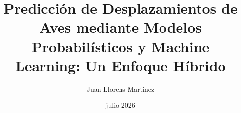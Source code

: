 \newcommand{\Estudios}{Grado}

\newcommand{\TituloEstudios}{Matem\'aticas e Inform\'atica}

\newcommand{\Departamento}{Departamento de Lenguajes y Sistemas Inform\'aticos}

\newcommand{\NombreAutor}{Juan Llorens Mart\'inez}

\newcommand{\NombreTutor}{Adriana Toni Delgado}

\newcommand{\TituloTFG}{Predicci\'on de Desplazamientos de Aves mediante Modelos Probabil\'isticos y Machine Learning: Un Enfoque H\'ibrido}

\newcommand{\Fecha}{julio 2026}

\title{\TituloTFG}
\author{\NombreAutor}
\date{\Fecha}
